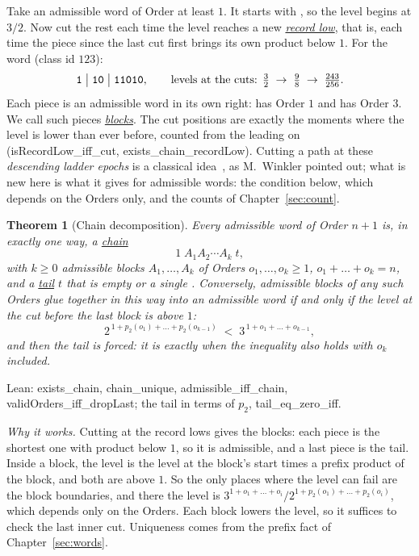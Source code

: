 \documentclass[10pt,a4paper,titlepage]{article}
\makeatletter
\newcommand{\termhere}[1]{\leavevmode
  \Hy@raisedlink{\hyper@anchorstart{term:#1}\hyper@anchorend}}
\newcommand{\keyterm}[2]{\hyperlink{box:#1}{\emph{#2}}}
\newcommand{\lean}[1]{\textsf{#1}}
\newtheorem{theorem}{Theorem}
\makeatother
\begin{document}
\termhere{recordlow}Take an admissible word of Order at least $1$. It starts with , so the level
begins at $3/2$. Now cut the rest each time the level reaches a new \keyterm{recordlow}{record
low}, that is, each time the piece since the last cut first brings its own
product below $1$. For the word  (class id $123$):
\[
\text{\texttt{1}} \;\big|\; \text{\texttt{10}} \;\big|\; \text{\texttt{11010}},
\qquad
\text{levels at the cuts: } \tfrac32 \;\to\; \tfrac98 \;\to\; \tfrac{243}{256}.
\]
\termhere{block}Each piece is an admissible word in its own right:  has Order $1$ and
 has Order $3$. We call such pieces \keyterm{block}{blocks}. The cut positions
are exactly the moments where the level is lower than ever before, counted from the
leading  on
(\lean{isRecordLow\_iff\_cut}, \lean{exists\_chain\_recordLow}). Cutting a
path at these \emph{descending ladder epochs} is a classical
idea~\cite{Feller1971}, as M.~Winkler pointed out; what is new here is what it gives for admissible words:
the condition below, which depends on the Orders only, and the counts of
Chapter~\ref{sec:count}.

\begin{theorem}[Chain decomposition]
\label{thm:chain}
\termhere{chain}Every admissible word of Order $n+1$ is, in exactly one way, a \keyterm{chain}{chain}
\[
1 \; A_1 A_2 \cdots A_k \; t,
\]
\termhere{tail}with $k \ge 0$ admissible blocks $A_1, \dots, A_k$ of Orders $o_1, \dots, o_k \ge 1$,
$o_1 + \dots + o_k = n$, and a \keyterm{tail}{tail} $t$ that is empty or a single .
Conversely, admissible blocks of any such Orders glue together in this way into an
admissible word if and only if the level at the cut before the last block is above $1$:
\[
2^{\,1 + p_2(o_1) + \dots + p_2(o_{k-1})} \;<\; 3^{\,1 + o_1 + \dots + o_{k-1}},
\]
and then the tail is forced: it is  exactly when the inequality also holds
with $o_k$ included.
\end{theorem}
Lean: \lean{exists\_chain}, \lean{chain\_unique}, \lean{admissible\_iff\_chain},
\lean{validOrders\_iff\_dropLast}; the tail in terms of $p_2$, \lean{tail\_eq\_zero\_iff}.

\medskip
\emph{Why it works.} Cutting at the record lows gives the blocks: each piece is the
shortest one with product below $1$, so it is admissible, and a last piece  is
the tail. Inside a block, the level is the level at the block's start
times a prefix product of the block, and both are above $1$. So the only places
where the level can fail are the block boundaries, and there the level is
$3^{1+o_1+\dots+o_i}/2^{1+p_2(o_1)+\dots+p_2(o_i)}$, which depends only on the
Orders. Each block lowers the level, so it suffices to check the last inner
cut. Uniqueness comes from the prefix fact of Chapter~\ref{sec:words}.
\end{document}
